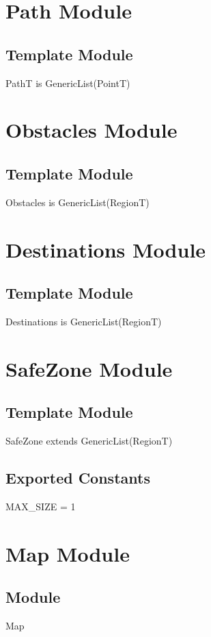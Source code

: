 \documentclass[12pt]{article}
\begin{document}
\section* {Path Module}
\subsection* {Template Module}
PathT is GenericList(PointT)
\section* {Obstacles Module}
\subsection* {Template Module}
Obstacles is GenericList(RegionT)
\section* {Destinations Module}
\subsection* {Template Module}
Destinations is GenericList(RegionT)
\section* {SafeZone Module}
\subsection* {Template Module}
SafeZone extends GenericList(RegionT)
\subsection*{Exported Constants}
MAX\_SIZE = 1
\newpage
\section* {Map Module}
\subsection* {Module}
Map
\end{document}
